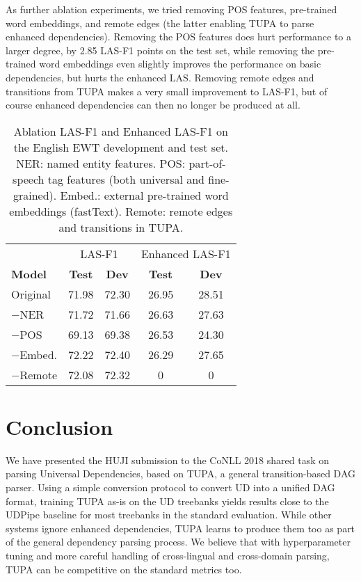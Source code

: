 \documentclass[11pt,a4paper]{article}
\begin{document}
As further ablation experiments, we tried removing POS features,
pre-trained word embeddings,
and remote edges (the latter enabling TUPA to parse enhanced dependencies).
Removing the POS features does hurt performance to a larger degree,
by 2.85 LAS-F1 points on the test set,
while removing the pre-trained word embeddings
even slightly improves the performance on basic dependencies,
but hurts the enhanced LAS.
Removing remote edges and transitions from TUPA makes a very small improvement
to LAS-F1, but of course enhanced dependencies
can then no longer be produced at all.


\begin{table}[t]
\begin{tabular}{l|cc|cc}
\hline
& \multicolumn{2}{c|}{\small LAS-F1} & \multicolumn{2}{c}{\small Enhanced LAS-F1} \\
\bf Model & \bf Test & \bf Dev & \bf Test & \bf Dev \\
\hline
Original & 71.98 & 72.30 & 26.95 & 28.51 \\
$-$NER & 71.72 & 71.66 & 26.63 & 27.63\\
$-$POS & 69.13 & 69.38 & 26.53 & 24.30\\
$-$Embed. & 72.22 & 72.40 & 26.29 & 27.65\\
$-$Remote & 72.08 & 72.32 & 0 & 0
\end{tabular}
\caption{Ablation LAS-F1 and Enhanced LAS-F1 on the English EWT development
and test set.
NER: named entity features.
POS: part-of-speech tag features (both universal and fine-grained).
Embed.: external pre-trained word embeddings (fastText).
Remote: remote edges and transitions in TUPA.
\label{tab:ablation}}
\end{table}

\section{Conclusion}\label{sec:conclusion}

We have presented the HUJI submission to the CoNLL 2018 shared task on parsing Universal Dependencies, based on TUPA, a general transition-based DAG parser.
Using a simple conversion protocol to convert UD into a unified DAG format,
training TUPA as-is on the UD treebanks yields results
close to the UDPipe baseline for most treebanks in the standard evaluation.
While other systems ignore enhanced dependencies,
TUPA learns to produce them too as part of the general dependency parsing process.
We believe that with hyperparameter tuning and more careful handling of
cross-lingual and cross-domain parsing, TUPA can be competitive on the standard metrics too.
\end{document}
